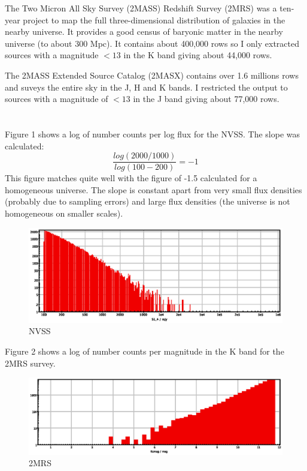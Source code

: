 \documentclass[a4paper,12pt]{article}
\begin{document}
The Two Micron All Sky Survey (2MASS) Redshift Survey (2MRS) was a ten-year project to map the full three-dimensional distribution of galaxies in
the nearby universe. It provides a good census of baryonic matter in the nearby universe (to about 300 Mpc). It contains
about 400,000 rows so I only extracted sources with a magnitude $<13$ in the K band giving about 44,000 rows.

The 2MASS Extended Source Catalog (2MASX) contains over 1.6 millions rows and suveys the entire sky in the J, H and K bands.
I restricted the output to sources with a magnitude of $<13$ in the J band giving about 77,000 rows.

\section{}
Figure 1 shows a log of number counts per log flux for the NVSS. The slope was calculated:
\begin{equation}
\frac{log(2000/1000)}{log(100-200)}=-1
\end{equation}
This figure matches quite well with the figure of -1.5 calculated for a homogeneous universe. The slope is constant apart
from very small flux densities (probably due to sampling errors) and large flux densities (the universe is not
homogeneous on smaller scales).
\begin{figure}[H]
\centering
\includegraphics[width=.9\textwidth]{./NVSS.eps}
\caption{NVSS}
\label{fig:1}
\end{figure}
Figure 2 shows a log of number counts per magnitude in the K band for the 2MRS survey.
\begin{figure}[H]
\centering
\includegraphics[width=.9\textwidth]{./2MRS.eps}
\caption{2MRS}
\label{fig:2}
\end{figure}
\end{document}
